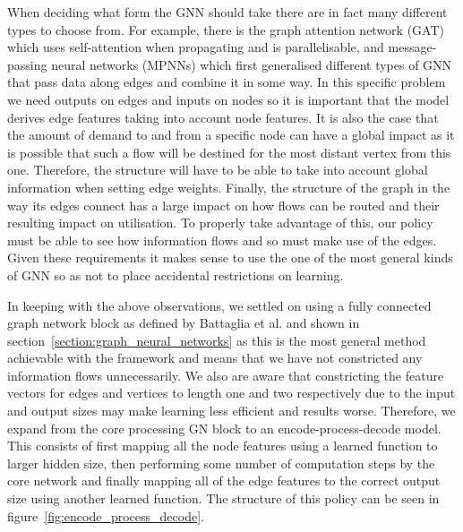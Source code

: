 When deciding what form the GNN should take there are in fact many different types to choose from. For example, there is the graph attention network (GAT)\cite{velivckovic2017graph} which uses self-attention when propagating and is parallelisable, and message-passing neural networks (MPNNs)\cite{gilmer2017neural} which first generalised different types of GNN that pass data along edges and combine it in some way. In this specific problem we need outputs on edges and inputs on nodes so it is important that the model derives edge features taking into account node features. It is also the case that the amount of demand to and from a specific node can have a global impact as it is possible that such a flow will be destined for the most distant vertex from this one. Therefore, the structure will have to be able to take into account global information when setting edge weights. Finally, the structure of the graph in the way its edges connect has a large impact on how flows can be routed and their resulting impact on utilisation. To properly take advantage of this, our policy must be able to see how information flows and so must make use of the edges. Given these requirements it makes sense to use the one of the most general kinds of GNN so as not to place accidental restrictions on learning.

In keeping with the above observations, we settled on using a fully connected graph network block as defined by Battaglia et al.\cite{battaglia2018relational} and shown in section~\ref{section:graph_neural_networks} as this is the most general method achievable with the framework and means that we have not constricted any information flows unnecessarily. We also are aware that constricting the feature vectors for edges and vertices to length one and two respectively due to the input and output sizes may make learning less efficient and results worse. Therefore, we expand from the core processing GN block to an encode-process-decode model. This consists of first mapping all the node features using a learned function to larger hidden size, then performing some number of computation steps by the core network and finally mapping all of the edge features to the correct output size using another learned function. The structure of this policy can be seen in figure~\ref{fig:encode_process_decode}.


